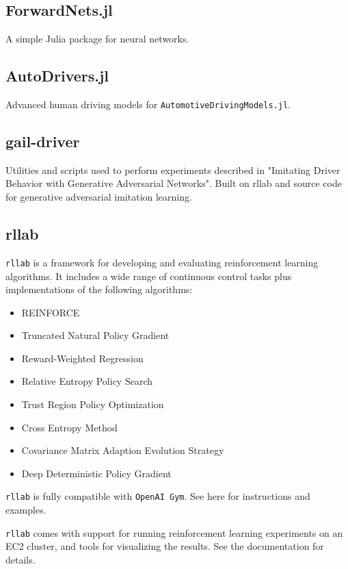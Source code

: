\subsection{ForwardNets.jl}

A simple Julia package for neural networks.

\subsection{AutoDrivers.jl}

Advanced human driving models for {\tt AutomotiveDrivingModels.jl}.

\subsection{gail-driver}

Utilities and scripts used to perform experiments described in "Imitating Driver Behavior with Generative Adversarial Networks". Built on rllab and source code for generative adversarial imitation learning.


\subsection{rllab}

{\tt rllab} is a framework for developing and evaluating reinforcement learning algorithms. It includes a wide range of continuous control tasks plus implementations of the following algorithms:

\begin{itemize}
\item    REINFORCE
\item    Truncated Natural Policy Gradient
\item    Reward-Weighted Regression
\item    Relative Entropy Policy Search
\item    Trust Region Policy Optimization
\item    Cross Entropy Method
\item    Covariance Matrix Adaption Evolution Strategy
\item    Deep Deterministic Policy Gradient
\end{itemize}

{\tt rllab} is fully compatible with {\tt OpenAI Gym}. See here for instructions and examples.

{\tt rllab} comes with support for running reinforcement learning experiments on an EC2 cluster, and tools for visualizing the results. See the documentation for details.

